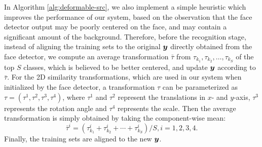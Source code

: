 \documentclass[12pt,journal,draftcls,letterpaper,onecolumn]{IEEEtran}
\begin{document}
In Algorithm \ref{alg:deformable-src}, we also implement a simple heuristic which improves the
performance of our system, based on the observation that the face detector output may be poorly centered on
the face, and may contain a significant amount of the background.  Therefore, before the recognition stage,
instead of aligning the training sets to the
original ${\boldsymbol{y}}$ directly obtained from the face detector, we
compute an average transformation $\bar{\tau}$ from $\tau_{k_1},
\tau_{k_2}, \ldots, \tau_{k_S}$ of the top $S$ classes, which
is believed to be better centered, and update ${\boldsymbol{y}}$ according to
$\bar{\tau}$. For the 2D similarity transformations, which are
used in our system when initialized by the face detector, a
transformation $\tau$ can be parameterized as $\tau = (\tau^1,
\tau^2, \tau^3, \tau^4)$, where $\tau^1$ and $\tau^2$ represent
the translations in $x$- and $y$-axis, $\tau^3$ represents the
rotation angle and $\tau^4$ represents the scale. Then the
average transformation is simply obtained by taking the
component-wise mean:
\begin{displaymath}
\bar{\tau}^i = (\tau_{k_1}^i + \tau_{k_2}^i + \cdots +
\tau_{k_S}^i) / S, i = 1,2,3,4.
\end{displaymath}
Finally, the training sets are aligned to the new ${\boldsymbol{y}}$.
\end{document}
